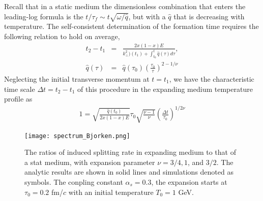 Recall that in a static medium the dimensionless combination that enters the leading-log formula is the $t/\tau_f \sim t \sqrt{\omega/\hat{q}}$, but with a $\hat{q}$ that is decreasing with temperature.
The self-consistent determination of the formation time requires the following relation to hold on average,
\begin{eqnarray}
t_2 - t_1 &=& \frac{2x(1-x)E}{k_{\perp}^2)(t_1) + \int_{t_0}^{t} \hat{q}(\tau) d\tau},\\
\hat{q}(\tau) &=& \hat{q}(\tau_0) \left(\frac{\tau_0}{\tau}\right)^{2-1/\nu}
\end{eqnarray}
Neglecting the initial transverse momentum at $t=t_1$, we have the characteristic time scale $\Delta t = t_2 - t_1$ of this procedure in the expanding medium temperature profile as
\begin{eqnarray}
1 = \sqrt{\frac{\hat{q}(t_0)}{2x(1-x)E}} \tau_0 \sqrt{\frac{\nu-1}{\nu}} \left(\frac{\Delta t}{\tau_0}\right)^{1/2\nu}
\end{eqnarray}

\begin{figure}
\texttt{[image: spectrum\_Bjorken.png]}
\caption{The ratios of induced splitting rate in expanding medium to that of a stat medium, with expansion parameter $\nu = 3/4, 1$, and $3/2$. The analytic results are shown in solid lines and simulations denoted as symbols. The conpling constant $\alpha_s=0.3$, the expansion starts at $\tau_0 = 0.2$ fm/$c$ with an initial temperature $T_0 = 1$ GeV.}
\label{fig:Bjorken-BDMPS}
\end{figure}

